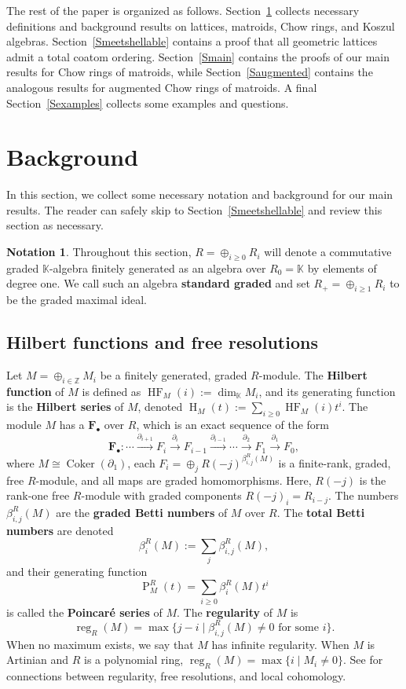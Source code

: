 \documentclass[11pt, reqno]{amsart}
\DeclareMathOperator{\coker}{Coker}
\DeclareMathOperator{\HF}{\mathrm{HF}}
\DeclareMathOperator{\HS}{\mathrm{H}}
\newcommand{\iso}{\cong}
\newcommand{\kk}{\mathbb{K}}					%
\DeclareMathOperator{\Poin}{P}
\DeclareMathOperator{\reg}{reg}					%
\newcommand{\term}[1]{\textbf{\textsf{#1}}}
\newcommand{\ZZ}{\mathbb{Z}}
\theoremstyle{definition}
\newtheorem*{notation}{Notation}
\numberwithin{equation}{section}
\numberwithin{table}{section}
\begin{document}
\begin{spacing}{1.1}
The rest of the paper is organized as follows.  Section~\ref{Sback} collects necessary definitions and background results on lattices, matroids, Chow rings, and Koszul algebras.  Section~\ref{Smeetshellable} contains a proof that all geometric lattices admit a total coatom ordering.  Section~\ref{Smain} contains the proofs of our main results for Chow rings of matroids, while Section~\ref{Saugmented} contains the analogous results for augmented Chow rings of matroids.  A final Section~\ref{Sexamples} collects some examples and questions.

\section{Background}\label{Sback}

In this section, we collect some necessary notation and background for our main results.  The reader can safely skip to Section~\ref{Smeetshellable} and review this section as necessary.

\begin{notation}
Throughout this section, $R = \oplus_{i \ge 0} R_i$ will denote a commutative graded $\kk$-algebra finitely generated as an algebra over $R_0 = \kk$ by elements of degree one.  We call such an algebra \term{standard graded} and set $R_+ = \oplus_{i \ge 1} R_i$ to be the graded maximal ideal.
\end{notation} 

\subsection{Hilbert functions and free resolutions}\label{SSkoszul}

 Let $M = \oplus_{i \in \ZZ} M_i$ be a finitely generated, graded $R$-module.  The \term{Hilbert function} of $M$ is defined as $\HF_M(i) := \dim_\kk M_i$, and its generating function is the \term{Hilbert series} of $M$, denoted $\HS_M(t) := \sum_{i \ge 0} \HF_M(i) t^i$.  The module $M$ has a  $\mathbf{F}_\bullet$ over $R$, which is an exact sequence of the form
\[\mathbf{F}_\bullet: \cdots \xrightarrow{\partial_{i+1}} F_i \xrightarrow{\partial_{i}} F_{i-1} \xrightarrow{\partial_{i-1}} \cdots \xrightarrow{\partial_2} F_1 \xrightarrow{\partial_1} F_0,\]
where $M \iso \coker(\partial_1)$, each $F_i = \oplus_{j} R(-j)^{\beta^R_{i,j}(M)}$ is a finite-rank, graded, free $R$-module, and all maps are graded homomorphisms.  Here, $R(-j)$ is the rank-one free $R$-module with graded components $R(-j)_i = R_{i-j}$.  The numbers $\beta^R_{i,j}(M)$ are the \term{graded Betti numbers} of $M$ over $R$.  The \term{total Betti numbers} are denoted 
\[ \beta_i^R(M) := \sum_j \beta_{i,j}^R(M),\]  
and their generating function
\[ \Poin_M^R(t) = \sum_{i \ge 0} \beta_i^R(M)t^i \]
is called the \term{Poincar\'{e} series} of $M$.  The \term{regularity} of $M$ is 
\[ \reg_R(M) = \max\{j-i \mid \beta_{i,j}^R(M) \neq 0 \text{ for some $i$}\}. \]  
When no maximum exists, we say that $M$ has infinite regularity.  When $M$ is Artinian and $R$ is a polynomial ring, $\reg_R(M) = \max\{i \mid M_i \neq 0\}$.  See \cite{Eis05} for connections between regularity, free resolutions, and local cohomology.


\end{spacing}
\end{document}
